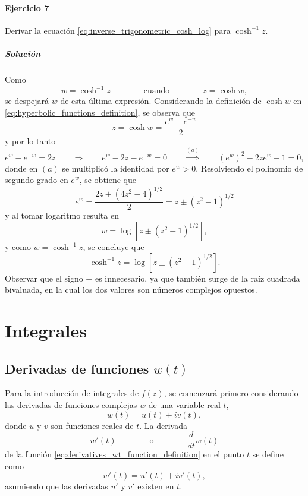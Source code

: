 \documentclass[a4paper]{report}
\begin{document}
\subsubsection{Ejercicio 7}

Derivar la ecuación \ref{eq:inverse_trigonometric_cosh_log} para \(\cosh^{-1}z\).

\paragraph{Solución} Como
\[
 w=\cosh^{-1}z
 \qquad\qquad\textrm{cuando}\qquad\qquad
 z=\cosh w,
\]
se despejará \(w\) de esta última expresión. Considerando la definición de \(\cosh w\) en  \ref{eq:hyperbolic_functions_definition}, se observa que 
\[
 z=\cosh w=\dfrac{e^w-e^{-w}}{2}
\]
y por lo tanto
\[
 e^w-e^{-w}=2z
 \qquad\Rightarrow\qquad 
 e^w-2z-e^{-w}=0
 \qquad\overset{(a)}{\Rightarrow}\qquad 
 (e^w)^2-2ze^w-1=0,
\]
donde en \((a)\) se multiplicó la identidad por \(e^w>0\). Resolviendo el polinomio de segundo grado en \(e^w\), se obtiene que 
\[
 e^w=\frac{2z\pm(4z^2-4)^{1/2}}{2}=z\pm(z^2-1)^{1/2}
\]
y al tomar logaritmo resulta en 
\[
 w=\log\left[z\pm(z^2-1)^{1/2}\right],
\]
y como \(w=\cosh^{-1}z\), se concluye que 
\[
 \cosh^{-1}z=\log\left[z\pm(z^2-1)^{1/2}\right].
\]
Observar que el signo \(\pm\) es innecesario, ya que también surge de la raíz cuadrada bivaluada, en la cual los dos valores son números complejos opuestos. 

\chapter{Integrales}

\section{Derivadas de funciones \texorpdfstring{\(w(t)\)}{w(t)}}\label{sec:integrals_derivatives_of_wt}

Para la introducción de integrales de \(f(z)\), se comenzará primero considerando las derivadas de funciones complejas \(w\) de una variable real \(t\),
\begin{equation}\label{eq:derivatives_wt_function_definition}
 w(t)=u(t)+iv(t), 
\end{equation}
donde \(u\) y \(v\) son funciones reales de \(t\). La derivada
\[
 w'(t)
 \qquad\qquad\textrm{o}\qquad\qquad
 \frac{d}{dt}w(t)
\]
de la función \ref{eq:derivatives_wt_function_definition} en el punto \(t\) se define como
\begin{equation}\label{eq:derivatives_wt_derivative_definition}
 w'(t)=u'(t)+iv'(t), 
\end{equation}
asumiendo que las derivadas \(u'\) y \(v'\) existen en \(t\).
\end{document}
